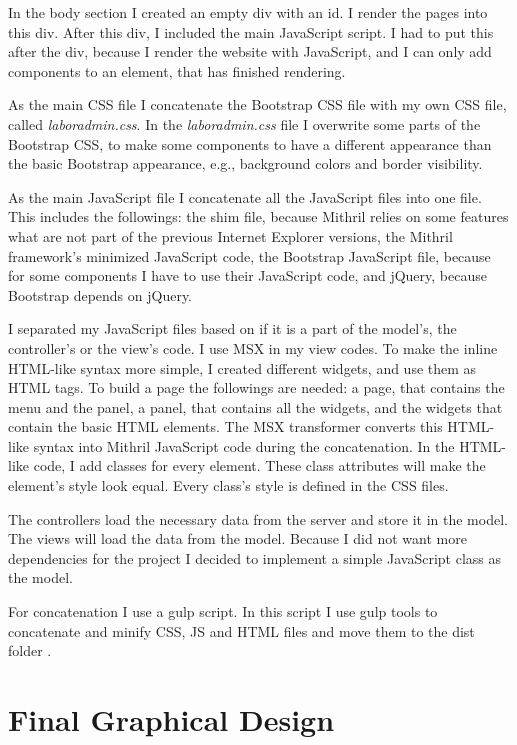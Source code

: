 In the body section I created an empty div with an id. I render the pages into this div. After this div, I included the main JavaScript script. I had to put this after the div, because I render the website with JavaScript, and I can only add components to an element, that has finished rendering.

As the main CSS file I concatenate the Bootstrap CSS file with my own CSS file, called \mbox{\emph{laboradmin.css}}. In the \mbox{\emph{laboradmin.css}} file I overwrite some parts of the Bootstrap CSS, to make some components to have a different appearance than the basic Bootstrap appearance, e.g., background colors and border visibility.

As the main JavaScript file I concatenate all the JavaScript files into one file. This includes the followings: the shim file, because Mithril relies on some features what are not part of the previous Internet Explorer versions, the Mithril framework's minimized JavaScript code, the Bootstrap JavaScript file, because for some components I have to use their JavaScript code, and jQuery, because Bootstrap depends on jQuery. 

I separated my JavaScript files based on if it is a part of the model's, the controller's or the view's code. I use MSX in my view codes. To make the inline HTML-like syntax more simple, I created different widgets, and use them as HTML tags. To build a page the followings are needed: a page, that contains the menu and the panel, a panel, that contains all the widgets, and the widgets that contain the basic HTML elements. The MSX transformer converts this HTML-like syntax into Mithril JavaScript code during the concatenation. In the HTML-like code, I add classes for every element. These class attributes will make the element's style look equal. Every class's style is defined in the CSS files.

The controllers load the necessary data from the server and store it in the model. The views will load the data from the model. Because I did not want more dependencies for the project I decided to implement a simple JavaScript class as the model.

For concatenation I use a gulp script. In this script I use gulp tools to concatenate and minify CSS, JS and HTML files and move them to the dist folder .

\section{Final Graphical Design}

